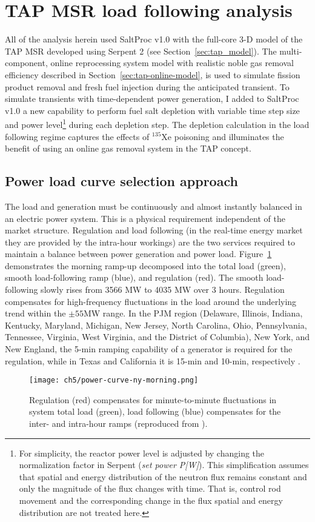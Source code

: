 \section{TAP MSR load following analysis}
All of the analysis herein used SaltProc v1.0 with the full-core 3-D model of 
the \gls{TAP} \gls{MSR} developed using Serpent 2 (see 
Section~\ref{sec:tap_model}). The multi-component, online reprocessing system 
model with realistic noble gas removal efficiency described in 
Section~\ref{sec:tap-online-model}, is used to simulate fission product 
removal and fresh fuel injection during the anticipated transient. To
simulate transients with time-dependent power generation, I added to SaltProc 
v1.0 a new capability to perform fuel salt depletion with variable time 
step size and power level\footnote{For simplicity, the reactor power level 
is adjusted by changing the normalization factor in Serpent (\emph{set power 
P[W]}). This simplification assumes that spatial and energy distribution of 
the neutron flux remains constant and only the magnitude of the flux changes 
with time. That is, control rod movement and the corresponding change in the 
flux spatial and energy distribution are not treated here.} during each 
depletion step. The depletion calculation in the load following regime 
captures the effects of $^{135}$Xe poisoning and illuminates the benefit of 
using an online gas removal system in the \gls{TAP} concept.

\subsection{Power load curve selection approach}\label{sec:worst-load}
The load and generation must be continuously and almost instantly balanced in 
an electric power system. This is a physical requirement independent of the 
market structure. Regulation and load following (in the real-time energy 
market they are provided  by the 
intra-hour workings) are the two services 
required to maintain a balance between power generation and power load. 
Figure~\ref{fig:power-curve-ny} demonstrates the morning ramp-up decomposed 
into the total load (green), smooth load-following ramp (blue), and regulation 
(red). The smooth load-following slowly rises from 3566 MW to 4035 MW over 3 
hours. Regulation compensates for high-frequency fluctuations in the load 
around the underlying trend within the $\pm55$MW range. In the PJM region 
(Delaware, Illinois, Indiana, Kentucky, Maryland, Michigan, New Jersey, North 
Carolina, Ohio, Pennsylvania, Tennessee, Virginia, West Virginia, and the 
District of Columbia), New York, and New England, the 5-min ramping capability 
of a generator is required for the regulation, while in Texas and California 
it is 15-min and 10-min, respectively \cite{kirby_method_2005}.
\begin{figure}[htp!] %
	\centering
	\texttt{[image: ch5/power-curve-ny-morning.png]}
	\caption{Regulation (red) compensates for minute-to-minute fluctuations in 
	system total load (green), load following (blue) compensates for the 
	inter- and intra-hour ramps (reproduced from \cite{kirby_method_2005}).}
	\label{fig:power-curve-ny}
\end{figure}

